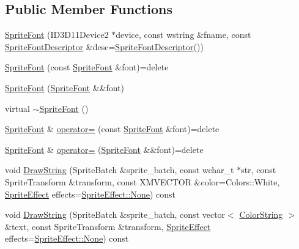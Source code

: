 \subsection*{Public Member Functions}
\begin{DoxyCompactItemize}
\item 
\hyperlink{classmage_1_1_sprite_font_ae9aaa257b25968d4681140c1594fc334}{Sprite\+Font} (I\+D3\+D11\+Device2 $\ast$device, const wstring \&fname, const \hyperlink{structmage_1_1_sprite_font_descriptor}{Sprite\+Font\+Descriptor} \&desc=\hyperlink{structmage_1_1_sprite_font_descriptor}{Sprite\+Font\+Descriptor}())
\item 
\hyperlink{classmage_1_1_sprite_font_a5df751fe06abda25127fdd9222e41948}{Sprite\+Font} (const \hyperlink{classmage_1_1_sprite_font}{Sprite\+Font} \&font)=delete
\item 
\hyperlink{classmage_1_1_sprite_font_ad1ba3d6947515b36b40b037a2760df29}{Sprite\+Font} (\hyperlink{classmage_1_1_sprite_font}{Sprite\+Font} \&\&font)
\item 
virtual \hyperlink{classmage_1_1_sprite_font_acbf50687b4a5dbb2ff1ad73ecc89b7f1}{$\sim$\+Sprite\+Font} ()
\item 
\hyperlink{classmage_1_1_sprite_font}{Sprite\+Font} \& \hyperlink{classmage_1_1_sprite_font_a3f95359a336adc87088eefe3103a770b}{operator=} (const \hyperlink{classmage_1_1_sprite_font}{Sprite\+Font} \&font)=delete
\item 
\hyperlink{classmage_1_1_sprite_font}{Sprite\+Font} \& \hyperlink{classmage_1_1_sprite_font_ab00b7f5c2740faf52ea778d94ae704bd}{operator=} (\hyperlink{classmage_1_1_sprite_font}{Sprite\+Font} \&\&font)=delete
\item 
void \hyperlink{classmage_1_1_sprite_font_a14b29a1669b3769bd09664b3b1685b43}{Draw\+String} (Sprite\+Batch \&sprite\+\_\+batch, const wchar\+\_\+t $\ast$str, const Sprite\+Transform \&transform, const X\+M\+V\+E\+C\+T\+OR \&color=Colors\+::\+White, \hyperlink{namespacemage_a9cfe18123066ba4236f548f9de75d881}{Sprite\+Effect} effects=\hyperlink{namespacemage_a9cfe18123066ba4236f548f9de75d881a6adf97f83acf6453d4a6a4b1070f3754}{Sprite\+Effect\+::\+None}) const
\item 
void \hyperlink{classmage_1_1_sprite_font_a10fee860b9ccbc3063c1721deb7688e5}{Draw\+String} (Sprite\+Batch \&sprite\+\_\+batch, const vector$<$ \hyperlink{structmage_1_1_color_string}{Color\+String} $>$ \&text, const Sprite\+Transform \&transform, \hyperlink{namespacemage_a9cfe18123066ba4236f548f9de75d881}{Sprite\+Effect} effects=\hyperlink{namespacemage_a9cfe18123066ba4236f548f9de75d881a6adf97f83acf6453d4a6a4b1070f3754}{Sprite\+Effect\+::\+None}) const

\end{DoxyCompactItemize}

